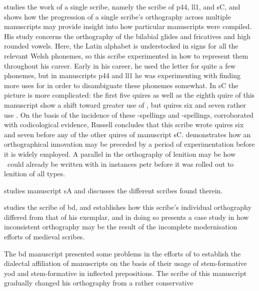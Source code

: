 \Textcite{Rus_Orthography93} studies the work of a single scribe, namely the scribe of \gls{p44}, \gls{ll1}, and \gls{sC}, and shows how the progression of a single scribe's orthography across multiple manuscripts may provide insight into how particular manuscripts were compiled. His study concerns the orthography of the bilabial glides and fricatives and high rounded vowels. Here, the Latin alphabet is understocked in signs for all the relevant Welsh phonemes, so this scribe experimented in how to represent them  throughout his career. Early in his career, he used the letter  for quite a few phonemes, but in manuscripts \gls{p44} and \gls{ll1} he was experimenting with finding more uses for  in order to disambiguate these phonemes somewhat. In \gls{sC} the picture is more complicated: the first five quires as well as the eighth quire of this manuscript show a shift toward greater use of , but quires six and seven rather use . On the basis of the incidence of these -spellings and -spellings, corroborated with codicological evidence, Russell concludes that this scribe wrote quires six and seven before any of the other quires of manuscript \gls{sC}. \Textcite{Rus_Orthography93} demonstrates how an orthographical innovation may be preceded by a period of experimentation before it is widely employed. A parallel in the orthography of lenition may be how \lT\ could already be written with  in instances \gls{petr} before it was rolled out to lenition of all types.

\Textcite{Rus_Scribal95} studies manuscript \gls{sA} and discusses the different scribes found therein. 

\Textcite{Rus_Whatdid99} studies the scribe of \gls{bd}, and establishes how this scribe's individual orthography differed from that of his exemplar, and in doing so presents a case study in how inconsistent orthography may be the result of the incomplete modernisation efforts of medieval scribes. %

The \gls{bd} manuscript presented some problems in the efforts of \textcite{Tho_Middle93} to establish the dialectal affiliation of manuscripts on the basis of their usage of stem-formative yod and stem-formative  in  inflected prepositions. The scribe of this manuscript gradually changed his orthography from a rather conservative %

